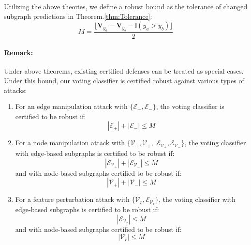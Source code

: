 Utilizing the above theories, we define a robust bound as the tolerance of changed subgraph predictions in Theorem.\ref{thm:Tolerance}:
\begin{equation}
M = \frac{\lfloor \mathbf{V}_{y_a}-\mathbf{V}_{y_b}-\mathbb{I}(y_{a}>y_{b})\rfloor}{2}
\end{equation}

\paragraph{Remark:} Under above theorems, existing certified defenses can be treated as special cases. 
Under this bound, our voting classifier is certified robust against various types of attacks:
\begin{enumerate}
    \item For an edge manipulation attack with $\{\mathcal{E}_+,\mathcal{E}_-\}$, the voting classifier is certified to be robust if:
    \begin{equation}
    |\mathcal{E}_+|+|\mathcal{E}_-|\leq M
    \end{equation}
    \item For a node manipulation attack with $\{\mathcal{V}_+, \mathcal{V}_+,$ $\mathcal{E}_{\mathcal{V}_+},\mathcal{E}_{\mathcal{V}_-}\}$, the voting classifier with edge-based subgraphs is certified to be robust if:
    \begin{equation}
        |\mathcal{E}_{\mathcal{V}_+}|+|\mathcal{E}_{\mathcal{V}_-}|\leq M
    \end{equation}
    and with node-based subgraphs certified to be robust if:
    \begin{equation}
        |\mathcal{V}_+|+|\mathcal{V}_-|\leq M
    \end{equation}
    \item For a feature perturbation attack with $\{\mathcal{V}_{r},\mathcal{E}_{\mathcal{V}_r}\}$, the voting classifier with edge-based subgraphs is certified to be robust if:
    \begin{equation}
        |\mathcal{E}_{\mathcal{V}_r}|\leq M
    \end{equation}
    and with node-based subgraphs certified to be robust if:
    \begin{equation}
        |\mathcal{V}_{r}| \leq M
    \end{equation}
\end{enumerate}



